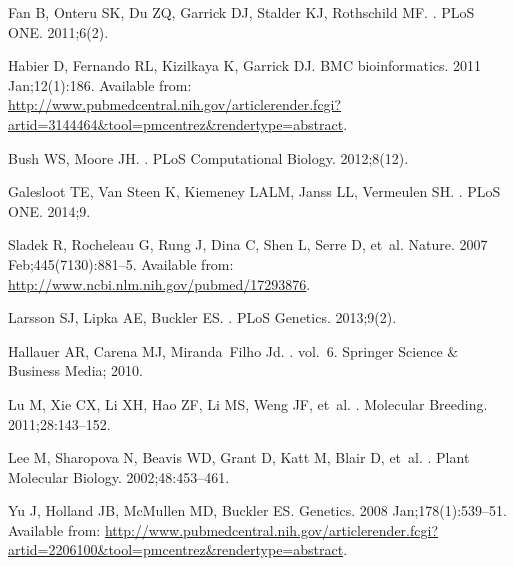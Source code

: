 \documentclass[10pt,letterpaper]{article}
\begin{document}
\begin{thebibliography}{}
Fan B, Onteru SK, Du ZQ, Garrick DJ, Stalder KJ, Rothschild MF.
.
\newblock PLoS ONE. 2011;6(2).

Habier D, Fernando RL, Kizilkaya K, Garrick DJ.
\newblock BMC bioinformatics. 2011 Jan;12(1):186.
\newblock Available from:
  \url{http://www.pubmedcentral.nih.gov/articlerender.fcgi?artid=3144464\&tool=pmcentrez\&rendertype=abstract}.

Bush WS, Moore JH.
.
\newblock PLoS Computational Biology. 2012;8(12).

Galesloot TE, {Van Steen} K, Kiemeney LALM, Janss LL, Vermeulen SH.
.
\newblock PLoS ONE. 2014;9.

Sladek R, Rocheleau G, Rung J, Dina C, Shen L, Serre D, et~al.
\newblock Nature. 2007 Feb;445(7130):881--5.
\newblock Available from: \url{http://www.ncbi.nlm.nih.gov/pubmed/17293876}.

Larsson SJ, Lipka AE, Buckler ES.
.
\newblock PLoS Genetics. 2013;9(2).

Hallauer AR, Carena MJ, Miranda~Filho Jd.
. vol.~6.
\newblock Springer Science \& Business Media; 2010.

Lu M, Xie CX, Li XH, Hao ZF, Li MS, Weng JF, et~al.
.
\newblock Molecular Breeding. 2011;28:143--152.

Lee M, Sharopova N, Beavis WD, Grant D, Katt M, Blair D, et~al.
.
\newblock Plant Molecular Biology. 2002;48:453--461.

Yu J, Holland JB, McMullen MD, Buckler ES.
\newblock Genetics. 2008 Jan;178(1):539--51.
\newblock Available from:
  \url{http://www.pubmedcentral.nih.gov/articlerender.fcgi?artid=2206100\&tool=pmcentrez\&rendertype=abstract}.


\end{thebibliography}
\end{document}
